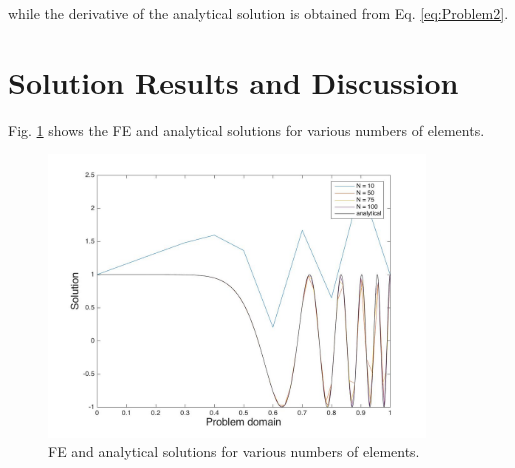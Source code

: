 \documentclass[10pt]{article}
\begin{document}
while the derivative of the analytical solution is obtained from Eq. \eqref{eq:Problem2}. 

\section{Solution Results and Discussion}

Fig. \ref{fig:Analytical} shows the FE and analytical solutions for various numbers of elements. 

\begin{figure}[H]
  \centering
  \includegraphics[width=10cm]{Nplot.jpg}
  \caption{FE and analytical solutions for various numbers of elements.}
  \label{fig:Analytical}
\end{figure}
\end{document}
